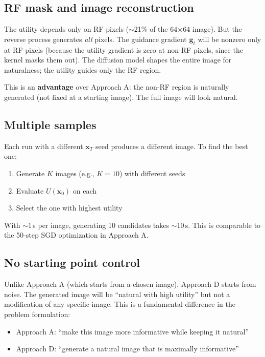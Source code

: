 \documentclass[11pt]{article}
\newcommand{\xb}{\mathbf{x}}
\newcommand{\gb}{\mathbf{g}}
\begin{document}
\subsection{RF mask and image reconstruction}

The utility depends only on RF pixels ($\sim$21\% of the 64$\times$64 image).
But the reverse process generates \emph{all} pixels. The guidance gradient
$\gb_t$ will be nonzero only at RF pixels (because the utility gradient is zero
at non-RF pixels, since the kernel masks them out). The diffusion model shapes
the entire image for naturalness; the utility guides only the RF region.

This is an \textbf{advantage} over Approach A: the non-RF region is naturally
generated (not fixed at a starting image). The full image will look natural.

\subsection{Multiple samples}

Each run with a different $\xb_T$ seed produces a different image. To find the
best one:
\begin{enumerate}[nosep]
    \item Generate $K$ images (e.g., $K = 10$) with different seeds
    \item Evaluate $U(\xb_0)$ on each
    \item Select the one with highest utility
\end{enumerate}

With $\sim$1\,s per image, generating 10 candidates takes $\sim$10\,s. This is
comparable to the 50-step SGD optimization in Approach A.

\subsection{No starting point control}

Unlike Approach A (which starts from a chosen image), Approach D starts from noise.
The generated image will be ``natural with high utility'' but not a modification of
any specific image. This is a fundamental difference in the problem formulation:
\begin{itemize}[nosep]
    \item Approach A: ``make this image more informative while keeping it natural''
    \item Approach D: ``generate a natural image that is maximally informative''
\end{itemize}
\end{document}
